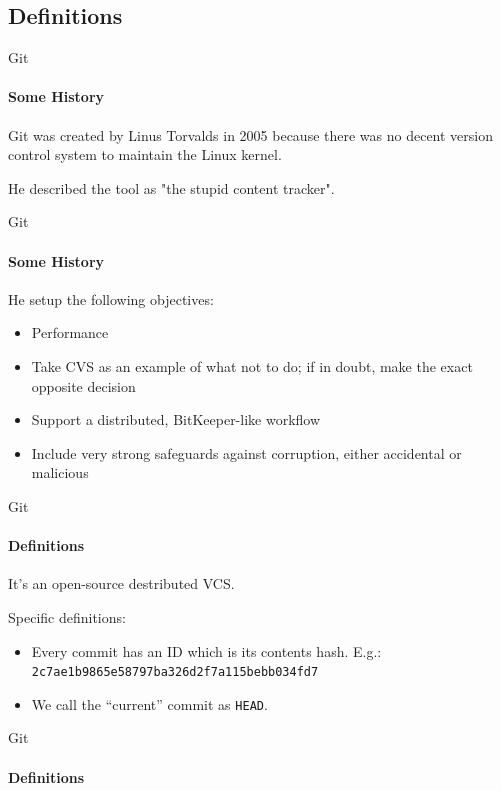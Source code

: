 \documentclass[aspectratio=169]{beamer}
\begin{document}
\subsection{Definitions}
\begin{frame}{Git}
\framesubtitle{Some History}
Git was created by Linus Torvalds in 2005 because there was no decent version control system to maintain the Linux kernel.

He described the tool as "the stupid content tracker".
\end{frame}

\begin{frame}{Git}
\framesubtitle{Some History}
He setup the following objectives:
\begin{itemize}
	\item Performance
	\item Take CVS as an example of what not to do; if in doubt, make the exact opposite decision
	\item Support a distributed, BitKeeper-like workflow
	\item Include very strong safeguards against corruption, either accidental or malicious
\end{itemize}
\end{frame}

\begin{frame}{Git}
\framesubtitle{Definitions}

It's an open-source destributed VCS.

Specific definitions:
\begin{itemize}
	\item Every commit has an ID which is its contents hash. E.g.: \texttt{2c7ae1b9865e58797ba326d2f7a115bebb034fd7}
	\item We call the ``current'' commit as \alert{\texttt{HEAD}}.
\end{itemize}

\end{frame}

\begin{frame}{Git}
\framesubtitle{Definitions}

\centering
{}

\end{frame}
\end{document}
